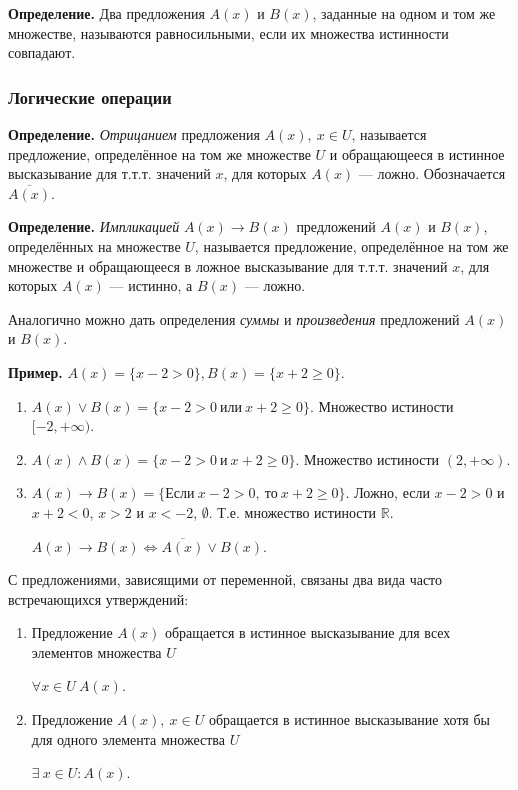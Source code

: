 \documentclass{article}
\begin{document}
    \textbf{Определение.} Два предложения \(A(x)\) и \(B(x)\), заданные на одном и том же множестве, называются равносильными, если их множества истинности совпадают.

    \subsubsection{Логические операции}

    \textbf{Определение.} \textit{Отрицанием} предложения \(A(x),\ x \in U\), называется предложение, определённое на том же множестве \(U\) и обращающееся в истинное высказывание для т.т.т. значений \(x\), для которых \(A(x)\) --- ложно. Обозначается \(\overline{A(x)}\).

    \textbf{Определение.} \textit{Импликацией} \(A(x) \rightarrow B(x)\) предложений \(A(x)\) и \(B(x)\), определённых на множестве \(U\), называется предложение, определённое на том же множестве и обращающееся в ложное высказывание для т.т.т. значений \(x\), для которых \(A(x)\) --- истинно, а \(B(x)\) --- ложно.

    Аналогично можно дать определения \textit{суммы} и \textit{произведения} предложений \(A(x)\) и \(B(x)\).

    \textbf{Пример.} \(A(x)=\{x-2>0\}, B(x)=\{x+2\geq 0\}\).
    
    \begin{enumerate}
        \item \(A(x) \vee B(x) = \{x-2>0\ \textrm{или}\ x+2\geq 0\}\). Множество истиности \([-2, +\infty)\).
        \item \(A(x) \wedge B(x) = \{x-2>0\ \textrm{и}\ x+2\geq 0\}\). Множество истиности \((2, +\infty)\).
        \item \(A(x) \rightarrow B(x) = \{\textrm{Если}\ x-2>0,\ \textrm{то}\ x+2\geq 0\}\). Ложно, если \(x-2>0\) и \(x+2<0\), \(x>2\) и \(x<-2\), \(\emptyset\). Т.е. множество истиности \(\mathbb{R}\).
        
        \(A(x) \rightarrow B(x) \Leftrightarrow \overline{A(x)} \vee B(x)\).
    \end{enumerate}

    С предложениями, зависящими от переменной, связаны два вида часто встречающихся утверждений:

    \begin{enumerate}
        \item Предложение \(A(x)\) обращается в истинное высказывание для всех элементов множества \(U\)
        \begin{center}
            \(\forall x \in U\ A(x)\).
        \end{center}
        \item Предложение \(A(x),\ x \in U\) обращается в истинное высказывание хотя бы для одного элемента множества \(U\)
        \begin{center}
            \(\exists\ x \in U: A(x)\).
        \end{center}
    \end{enumerate}
\end{document}
